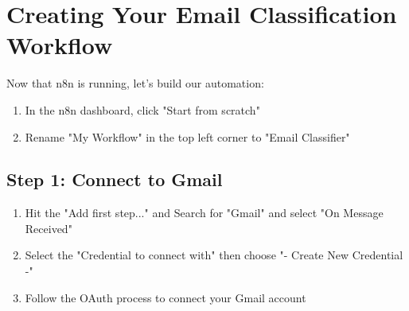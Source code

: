 

\section{Creating Your Email Classification Workflow}

Now that n8n is running, let's build our automation:

\begin{enumerate}
    \item In the n8n dashboard, click "Start from scratch"
    \item Rename "My Workflow" in the top left corner to "Email Classifier"
    \begin{minipage}[t]{\linewidth}
        \raggedright
        \medskip
    \end{minipage}

\end{enumerate}

\subsection{Step 1: Connect to Gmail}

\begin{enumerate}
    \item Hit the "Add first step..." and Search for "Gmail" and select "On Message Received"
    \item Select the "Credential to connect with" then choose "- Create New Credential -"
    \item Follow the OAuth process to connect your Gmail account
  \end{enumerate}

